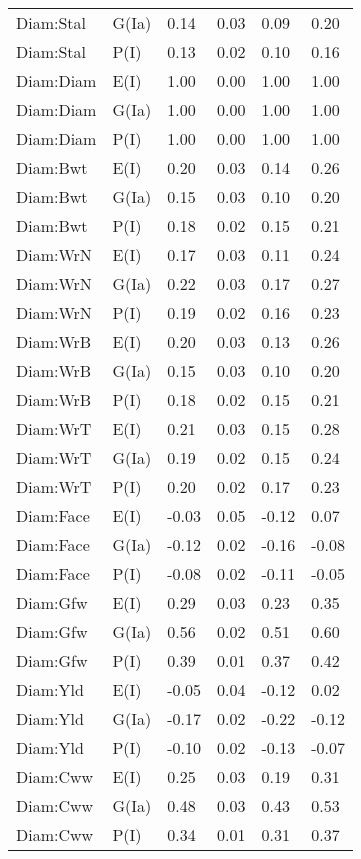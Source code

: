 \begin{center}
\begin{longtable}{|p{1.1in}|p{0.7in}|p{0.7in}|p{0.6in}|p{0.6in}|p{0.6in}|}
  Diam:Stal & G(Ia) & 0.14 & 0.03 & 0.09 & 0.20 \\ 
  Diam:Stal & P(I) & 0.13 & 0.02 & 0.10 & 0.16 \\ 
  Diam:Diam & E(I) & 1.00 & 0.00 & 1.00 & 1.00 \\ 
  Diam:Diam & G(Ia) & 1.00 & 0.00 & 1.00 & 1.00 \\ 
  Diam:Diam & P(I) & 1.00 & 0.00 & 1.00 & 1.00 \\ 
  Diam:Bwt & E(I) & 0.20 & 0.03 & 0.14 & 0.26 \\ 
  Diam:Bwt & G(Ia) & 0.15 & 0.03 & 0.10 & 0.20 \\ 
  Diam:Bwt & P(I) & 0.18 & 0.02 & 0.15 & 0.21 \\ 
  Diam:WrN & E(I) & 0.17 & 0.03 & 0.11 & 0.24 \\ 
  Diam:WrN & G(Ia) & 0.22 & 0.03 & 0.17 & 0.27 \\ 
  Diam:WrN & P(I) & 0.19 & 0.02 & 0.16 & 0.23 \\ 
  Diam:WrB & E(I) & 0.20 & 0.03 & 0.13 & 0.26 \\ 
  Diam:WrB & G(Ia) & 0.15 & 0.03 & 0.10 & 0.20 \\ 
  Diam:WrB & P(I) & 0.18 & 0.02 & 0.15 & 0.21 \\ 
  Diam:WrT & E(I) & 0.21 & 0.03 & 0.15 & 0.28 \\ 
  Diam:WrT & G(Ia) & 0.19 & 0.02 & 0.15 & 0.24 \\ 
  Diam:WrT & P(I) & 0.20 & 0.02 & 0.17 & 0.23 \\ 
  Diam:Face & E(I) & -0.03 & 0.05 & -0.12 & 0.07 \\ 
  Diam:Face & G(Ia) & -0.12 & 0.02 & -0.16 & -0.08 \\ 
  Diam:Face & P(I) & -0.08 & 0.02 & -0.11 & -0.05 \\ 
  Diam:Gfw & E(I) & 0.29 & 0.03 & 0.23 & 0.35 \\ 
  Diam:Gfw & G(Ia) & 0.56 & 0.02 & 0.51 & 0.60 \\ 
  Diam:Gfw & P(I) & 0.39 & 0.01 & 0.37 & 0.42 \\ 
  Diam:Yld & E(I) & -0.05 & 0.04 & -0.12 & 0.02 \\ 
  Diam:Yld & G(Ia) & -0.17 & 0.02 & -0.22 & -0.12 \\ 
  Diam:Yld & P(I) & -0.10 & 0.02 & -0.13 & -0.07 \\ 
  Diam:Cww & E(I) & 0.25 & 0.03 & 0.19 & 0.31 \\ 
  Diam:Cww & G(Ia) & 0.48 & 0.03 & 0.43 & 0.53 \\ 
  Diam:Cww & P(I) & 0.34 & 0.01 & 0.31 & 0.37 \\ 

\end{longtable}
\end{center}

